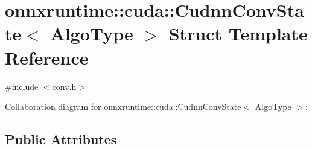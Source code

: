 \hypertarget{structonnxruntime_1_1cuda_1_1CudnnConvState}{}\section{onnxruntime\+:\+:cuda\+:\+:Cudnn\+Conv\+State$<$ Algo\+Type $>$ Struct Template Reference}
\label{structonnxruntime_1_1cuda_1_1CudnnConvState}


{\ttfamily \#include $<$conv.\+h$>$}



Collaboration diagram for onnxruntime\+:\+:cuda\+:\+:Cudnn\+Conv\+State$<$ Algo\+Type $>$\+:
\subsection*{Public Attributes}
